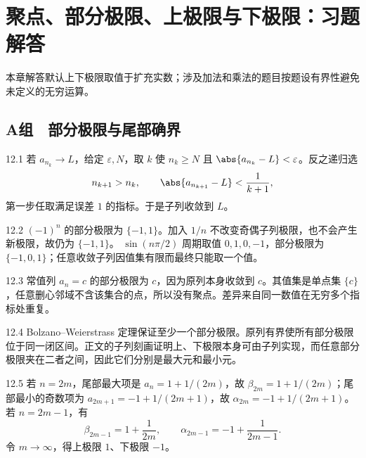 \chapter{聚点、部分极限、上极限与下极限：习题解答}

\begin{chapterguide}
本章解答默认上下极限取值于扩充实数；涉及加法和乘法的题目按题设有界性避免未定义的无穷运算。
\end{chapterguide}

\section*{A组　部分极限与尾部确界}

\begin{solution}{12.1}
若 \(a_{n_k}\to L\)，给定 \(\varepsilon,N\)，取 \(k\) 使
\(n_k\ge N\) 且 \(\abs{a_{n_k}-L}<\varepsilon\)。反之递归选
\[
 n_{k+1}>n_k,\qquad \abs{a_{n_{k+1}}-L}<\frac1{k+1},
\]
第一步任取满足误差 \(1\) 的指标。于是子列收敛到 \(L\)。
\end{solution}

\begin{solution}{12.2}
\((-1)^n\) 的部分极限为 \(\{-1,1\}\)。加入 \(1/n\) 不改变奇偶子列极限，也不会产生新极限，故仍为 \(\{-1,1\}\)。
\(\sin(n\pi/2)\) 周期取值 \(0,1,0,-1\)，部分极限为 \(\{-1,0,1\}\)；任意收敛子列因值集有限而最终只能取一个值。
\end{solution}

\begin{solution}{12.3}
常值列 \(a_n=c\) 的部分极限为 \(c\)，因为原列本身收敛到 \(c\)。其值集是单点集 \(\{c\}\)，任意删心邻域不含该集合的点，所以没有聚点。差异来自同一数值在无穷多个指标处重复。
\end{solution}

\begin{solution}{12.4}
Bolzano--Weierstrass 定理保证至少一个部分极限。原列有界使所有部分极限位于同一闭区间。正文的子列刻画证明上、下极限本身可由子列实现，而任意部分极限夹在二者之间，因此它们分别是最大元和最小元。
\end{solution}

\begin{solution}{12.5}
若 \(n=2m\)，尾部最大项是 \(a_n=1+1/(2m)\)，故
\(\beta_{2m}=1+1/(2m)\)；尾部最小的奇数项为
\(a_{2m+1}=-1+1/(2m+1)\)，故
\(\alpha_{2m}=-1+1/(2m+1)\)。
若 \(n=2m-1\)，有
\[
 \beta_{2m-1}=1+\frac1{2m},\qquad
 \alpha_{2m-1}=-1+\frac1{2m-1}.
\]
令 \(m\to\infty\)，得上极限 \(1\)、下极限 \(-1\)。
\end{solution}

